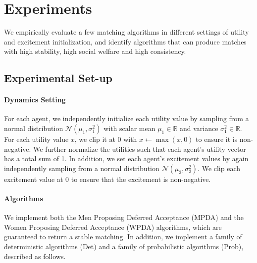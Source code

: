 \section{Experiments}
We empirically evaluate a few matching algorithms in different settings of utility and excitement initialization, and identify algorithms that can produce matches with high stability, high social welfare and high consistency.
\subsection{Experimental Set-up}
\paragraph{Dynamics Setting} For each agent, we independently initialize each utility value by sampling from a normal distribution $\mathcal{N}(\mu_1, \sigma_1^2)$ with scalar mean $\mu_1 \in \mathbb{R}$ and variance $\sigma_1^2 \in \mathbb{R}$. For each utility value $x$, we clip it at 0 with $x \leftarrow \max(x, 0)$ to ensure it is non-negative. We further normalize the utilities such that each agent's utility vector has a total sum of 1. In addition, we set each agent's excitement values by again independently sampling from a normal distribution $\mathcal{N}(\mu_2, \sigma_2^2)$. We clip each excitement value at 0 to ensure that the excitement is non-negative.

\paragraph{Algorithms} We implement both the Men Proposing Deferred Acceptance (MPDA) and the Women Proposing Deferred Acceptance (WPDA) algorithms, which are guaranteed to return a stable matching. In addition, we implement a family of deterministic algorithms (Det) and a family of probabilistic algorithms (Prob), described as follows.

